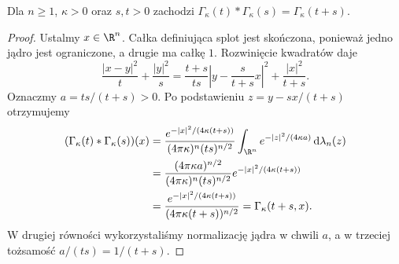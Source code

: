 \begin{lemat}
\label{lem:pde4-convolution}
Dla $n\geq1$, $\kappa>0$ oraz $s,t>0$ zachodzi
$\Gamma_\kappa(t)*\Gamma_\kappa(s)=\Gamma_\kappa(t+s)$.
\end{lemat}
\begin{proof}
Ustalmy $x\in\R^n$. Całka definiująca splot
jest skończona, ponieważ jedno jądro jest ograniczone,
a drugie ma całkę $1$. Rozwinięcie kwadratów daje
\[
 \frac{|x-y|^2}{t}+\frac{|y|^2}{s}
 =\frac{t+s}{ts}\left|y-\frac{s}{t+s}x\right|^2
 +\frac{|x|^2}{t+s}.
\]
Oznaczmy $a=ts/(t+s)>0$. Po podstawieniu
$z=y-sx/(t+s)$ otrzymujemy
\[
 \begin{aligned}
 (\Gamma_\kappa(t)*\Gamma_\kappa(s))(x)
 &=\frac{e^{-|x|^2/(4\kappa(t+s))}}
 {(4\pi\kappa)^n(ts)^{n/2}}
 \int_{\R^n}e^{-|z|^2/(4\kappa a)}
 \,\mathrm d\lambda_n(z)\\
 &=\frac{(4\pi\kappa a)^{n/2}}
 {(4\pi\kappa)^n(ts)^{n/2}}
 e^{-|x|^2/(4\kappa(t+s))}\\
 &=\frac{e^{-|x|^2/(4\kappa(t+s))}}
 {(4\pi\kappa(t+s))^{n/2}}
 =\Gamma_\kappa(t+s,x).
 \end{aligned}
\]
W drugiej równości wykorzystaliśmy normalizację
jądra w chwili $a$, a w trzeciej tożsamość
$a/(ts)=1/(t+s)$.
\end{proof}


